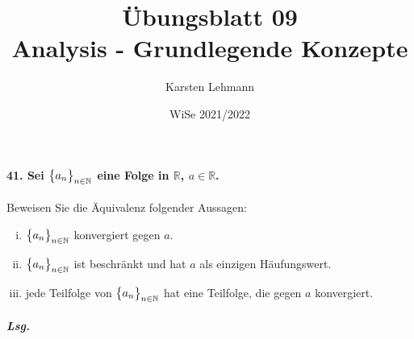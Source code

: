\documentclass{scrreprt}
\author{Karsten Lehmann}
\date{WiSe 2021/2022}
\title{Übungsblatt 09\\Analysis - Grundlegende Konzepte}
\begin{document}
\paragraph{41. Sei $\qty\big{a_n}_{n \in \mathbb{N}}$ eine Folge in
  $\mathbb{R}$, $a \in \mathbb{R}$.}
Beweisen Sie die Äquivalenz folgender Aussagen:
\begin{enumerate}[(i)]
\item $\qty\big{a_n}_{n \in \mathbb{N}}$ konvergiert gegen $a$.
\item $\qty\big{a_n}_{n \in \mathbb{N}}$ ist beschränkt und hat $a$ als einzigen
  Häufungswert.
\item jede Teilfolge von $\qty\big{a_n}_{n \in \mathbb{N}}$ hat eine Teilfolge,
  die gegen $a$ konvergiert.
\end{enumerate}

\subparagraph{Lsg.}
\end{document}
